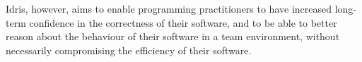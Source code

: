 Idris, however, aims to enable programming practitioners to have increased long-term confidence in the correctness of their software, and to be able to better reason about the behaviour of their software in a team environment, without necessarily compromising the efficiency of their software.

